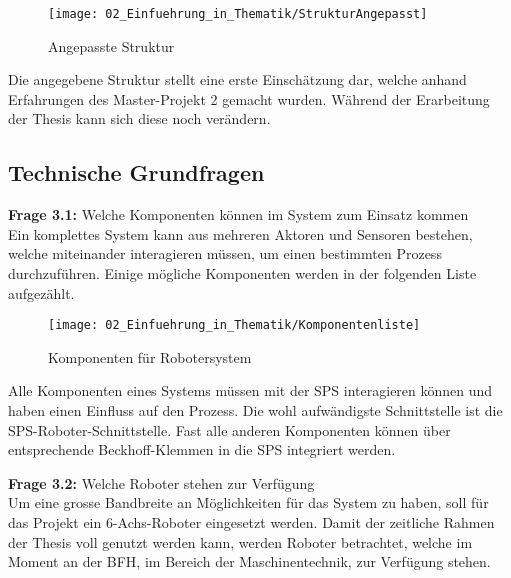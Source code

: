 		\begin{figure}[h!]
			\centering
			\texttt{[image: 02\_Einfuehrung\_in\_Thematik/StrukturAngepasst]}
			\captionsetup{justification=centering}
			\caption{Angepasste Struktur}
			\label{fig:StrukturAngepasst}
		\end{figure}
		
		Die angegebene Struktur stellt eine erste Einschätzung dar, welche anhand Erfahrungen des Master-Projekt 2 gemacht wurden. Während der Erarbeitung der Thesis kann sich diese noch verändern. 
	
	\vspace{3mm}
	
	\subsection{Technische Grundfragen} \label{Technische Grundfragen}
	
	\textbf{Frage 3.1:} Welche Komponenten können im System zum Einsatz kommen \vspace{2mm} 
	\\
		Ein komplettes System kann aus mehreren Aktoren und Sensoren bestehen, welche miteinander interagieren müssen, um einen bestimmten Prozess durchzuführen. Einige mögliche Komponenten werden in der folgenden Liste aufgezählt.
		
		\begin{figure}[h!]
			\centering
			\texttt{[image: 02\_Einfuehrung\_in\_Thematik/Komponentenliste]}
			\captionsetup{justification=centering}
			\caption{Komponenten für Robotersystem}
			\label{fig:Komponentenliste für Roboter}
		\end{figure}
		
		Alle Komponenten eines Systems müssen mit der SPS interagieren können und haben einen Einfluss auf den Prozess. Die wohl aufwändigste Schnittstelle ist die SPS-Roboter-Schnittstelle. Fast alle anderen Komponenten können über entsprechende Beckhoff-Klemmen in die SPS integriert werden.
	
	\vspace{3mm}
	
	\textbf{Frage 3.2:} Welche Roboter stehen zur Verfügung \vspace{2mm} 
	\\
		Um eine grosse Bandbreite an Möglichkeiten für das System zu haben, soll für das Projekt ein 6-Achs-Roboter eingesetzt werden. Damit der zeitliche Rahmen der Thesis voll genutzt werden kann, werden Roboter betrachtet, welche im Moment an der BFH, im Bereich der Maschinentechnik, zur Verfügung stehen. 
		
